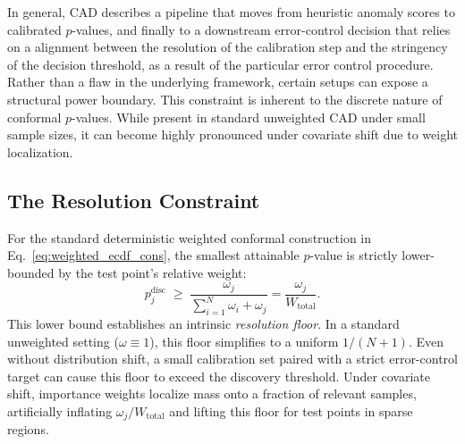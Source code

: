 In general, CAD describes a pipeline that moves from heuristic anomaly scores to calibrated $p$-values, and finally to a downstream error-control decision that relies on a alignment between the resolution of the calibration step and the stringency of the decision threshold, as a result of the particular error control procedure. Rather than a flaw in the underlying framework, certain setups can expose a structural power boundary. This constraint is inherent to the discrete nature of conformal $p$-values. While present in standard unweighted CAD under small sample sizes, it can become highly pronounced under covariate shift due to weight localization.

\subsection{The Resolution Constraint}
For the standard deterministic weighted conformal construction in Eq.~\eqref{eq:weighted_ecdf_cons}, the smallest attainable $p$-value is strictly lower-bounded by the test point's relative weight:
\begin{equation}\label{eq:resolution_floor}
p^{\mathrm{disc}}_{j} \;\ge\; \frac{\omega_j}{\sum_{i=1}^N \omega_i + \omega_j} = \frac{\omega_j}{W_{\mathrm{total}}}.
\end{equation}
This lower bound establishes an intrinsic \textit{resolution floor}. In a standard unweighted setting ($\omega \equiv 1$), this floor simplifies to a uniform $1/(N+1)$. Even without distribution shift, a small calibration set paired with a strict error-control target can cause this floor to exceed the discovery threshold. Under covariate shift, importance weights localize mass onto a fraction of relevant samples, artificially inflating $\omega_j / W_{\mathrm{total}}$ and lifting this floor for test points in sparse regions.


